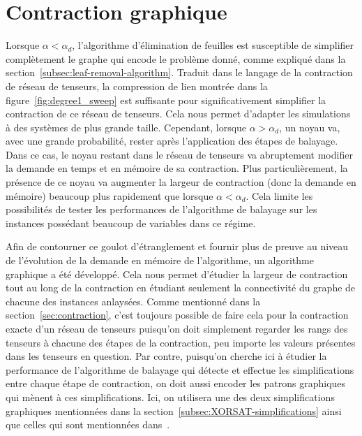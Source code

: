 \chapter{Contraction graphique} \label{ch:graphical-method}
Lorsque $\alpha < \alpha_d$, l'algorithme d'élimination de feuilles est susceptible de simplifier complètement le graphe qui encode le problème donné, comme expliqué dans la section~\ref{subsec:leaf-removal-algorithm}.
Traduit dans le langage de la contraction de réseau de tenseurs, la compression de lien montrée dans la figure~\ref{fig:degree1_sweep} est suffisante pour significativement simplifier la contraction de ce réseau de tenseurs.
Cela nous permet d'adapter les simulations à des systèmes de plus grande taille.
Cependant, lorsque $\alpha > \alpha_d$, un noyau va, avec une grande probabilité, rester après l'application des étapes de balayage.
Dans ce cas, le noyau restant dans le réseau de tenseurs va abruptement modifier la demande en temps et en mémoire de sa contraction.
Plus particulièrement, la présence de ce noyau va augmenter la largeur de contraction (donc la demande en mémoire) beaucoup plus rapidement que lorsque $\alpha < \alpha_d$.
Cela limite les possibilités de tester les performances de l'algorithme de balayage sur les instances possédant beaucoup de variables dans ce régime.

Afin de contourner ce goulot d'étranglement et fournir plus de preuve au niveau de l'évolution de la demande en mémoire de l'algorithme, un algorithme graphique a été développé.
Cela nous permet d'étudier la largeur de contraction tout au long de la contraction en étudiant seulement la connectivité du graphe de chacune des instances anlaysées.
Comme mentionné dans la section~\ref{sec:contraction}, c'est toujours possible de faire cela pour la contraction exacte d'un réseau de tenseurs puisqu'on doit simplement regarder les rangs des tenseurs à chacune des étapes de la contraction, peu importe les valeurs présentes dans les tenseurs en question.
Par contre, puisqu'on cherche ici à étudier la performance de l'algorithme de balayage qui détecte et effectue les simplifications entre chaque étape de contraction, on doit aussi encoder les patrons graphiques qui mènent à ces simplifications.
Ici, on utilisera une des deux simplifications graphiques mentionnées dans la section~\ref{subsec:XORSAT-simplifications} ainsi que celles qui sont mentionnées dans~\cite{denny_algebraically_2012}.

